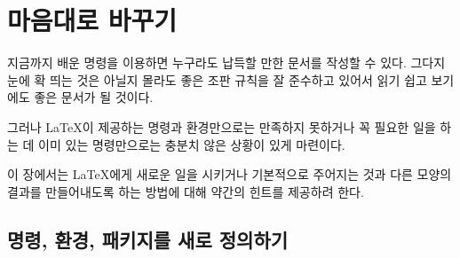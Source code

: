 \chapter{마음대로 바꾸기}



\begin{intro}
지금까지 배운 명령을 이용하면 누구라도 납득할 만한 문서를 작성할 수 있다.
그다지 눈에 확 띄는 것은 아닐지 몰라도 좋은 조판 규칙을 잘 준수하고 있어서 읽기 쉽고 보기에도 좋은 문서가 될 것이다.

그러나 \LaTeX 이 제공하는 명령과 환경만으로는 만족하지 못하거나 
꼭 필요한 일을 하는 데 이미 있는 명령만으로는 충분치 않은 상황이 있게 마련이다.

이 장에서는 \LaTeX 에게 새로운 일을 시키거나 기본적으로 주어지는 것과 다른 모양의 
결과를 만들어내도록 하는 방법에 대해 약간의 힌트를 제공하려 한다.
\end{intro}

\section{명령, 환경, 패키지를 새로 정의하기}

